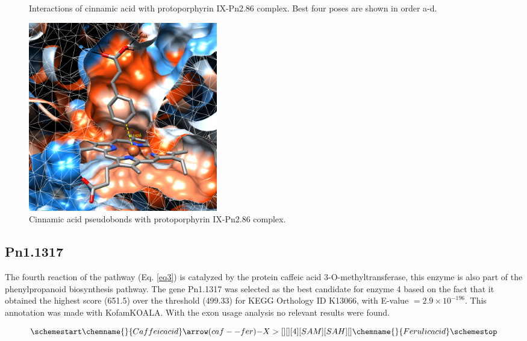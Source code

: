 \documentclass[12pt]{article}
\begin{document}
\begin{figure}[h!]
\begin{subfigure}[h!]{0.35\textwidth}
			\caption{}
		\end{subfigure}
		\hfill
		\caption[Interactions between cinnamic acid and protoporphyrin IX-Pn2.86 complex.]{\centering Interactions of cinnamic acid with protoporphyrin IX-Pn2.86 complex. Best four poses are shown in order a-d.}
		\label{fig2_5}
	\end{figure}
	\FloatBarrier
	
	\FloatBarrier
	\begin{figure}[h!]
		\centering
		\includegraphics[width=0.4\textwidth]{../2/Dock/Dock2/chimera.png}
		\caption{\centering Cinnamic acid pseudobonds with protoporphyrin IX-Pn2.86 complex.}
		\label{fig2_6}
	\end{figure}
	\FloatBarrier
	
	\subsection{Pn1.1317}
	
	The fourth reaction of the pathway (Eq. \ref{eq3}) is catalyzed by the protein caffeic acid 3-O-methyltransferase, this enzyme is also part of the phenylpropanoid biosynthesis pathway. The gene Pn1.1317 was selected as the best candidate for enzyme 4 based on the fact that it obtained the highest score (651.5) over the threshold (499.33) for KEGG Orthology ID K13066, with E-value $=2.9\times10^{-196}$. This annotation was made with KofamKOALA. \cite{kofamkoala} With the exon usage analysis no relevant results were found.
	
	\begin{equation}
	\schemestart
	\label{eq3}
	\chemname{\footnotesize}{Caffeic acid}\arrow(caf--fer){-X>[][][4][SAM][SAH][]}\chemname{\footnotesize}{Ferulic acid}
	\schemestop
	\end{equation}\\
	
\end{document}
